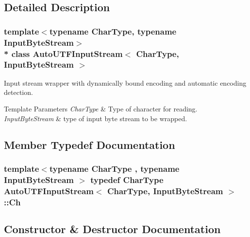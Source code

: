 \subsection{Detailed Description}
\subsubsection*{template$<$typename Char\+Type, typename Input\+Byte\+Stream$>$\\*
class Auto\+U\+T\+F\+Input\+Stream$<$ Char\+Type, Input\+Byte\+Stream $>$}

Input stream wrapper with dynamically bound encoding and automatic encoding detection. 


\begin{DoxyTemplParams}{Template Parameters}
{\em Char\+Type} & Type of character for reading. \\
\hline
{\em Input\+Byte\+Stream} & type of input byte stream to be wrapped. \\
\hline
\end{DoxyTemplParams}


\subsection{Member Typedef Documentation}
\subsubsection[{\texorpdfstring{Ch}{Ch}}]{\setlength{\rightskip}{0pt plus 5cm}template$<$typename Char\+Type , typename Input\+Byte\+Stream $>$ typedef Char\+Type {\bf Auto\+U\+T\+F\+Input\+Stream}$<$ Char\+Type, Input\+Byte\+Stream $>$\+::{\bf Ch}}\hypertarget{classAutoUTFInputStream_a3bb3eb46f2c20404a7ac21963cfe348f}{}\label{classAutoUTFInputStream_a3bb3eb46f2c20404a7ac21963cfe348f}


\subsection{Constructor \& Destructor Documentation}
